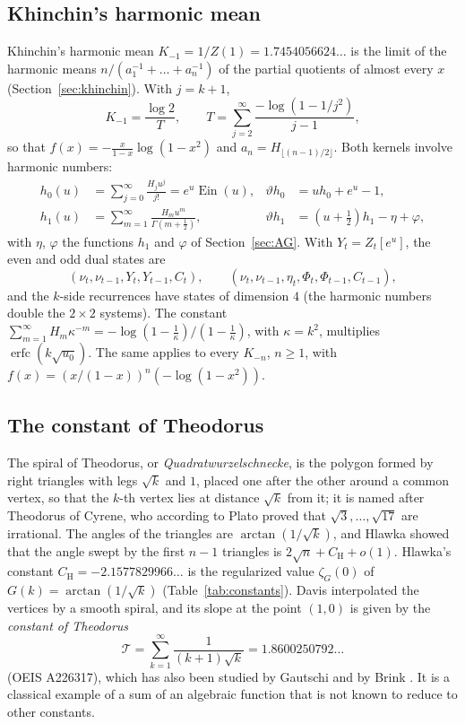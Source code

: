 \documentclass[11pt,reqno]{amsart}
\theoremstyle{definition}
\theoremstyle{remark}
\newcommand{\erfc}{\operatorname{erfc}}
\newcommand{\Ein}{\operatorname{Ein}}
\begin{document}
\subsection{Khinchin's harmonic mean}\label{sec:KH}
Khinchin's harmonic mean $K_{-1} = 1/Z(1) = 1.7454056624\ldots$ is the limit of the harmonic means
$n/(a_1^{-1} + \dots + a_n^{-1})$ of the partial quotients of almost every $x$ (Section~\ref{sec:khinchin}). With
$j = k+1$,
\[
  K_{-1} = \frac{\log 2}{T}, \qquad T = \sum_{j=2}^{\infty}\frac{-\log(1-1/j^2)}{j-1},
\]
so that $f(x) = -\frac{x}{1-x}\log(1-x^2)$ and $a_n = H_{\lfloor(n-1)/2\rfloor}$.
Both kernels involve harmonic numbers:
\begin{align*}
  h_0(u) &= \sum_{j=0}^{\infty}\frac{H_j u^j}{j!} = e^u\Ein(u), & \vartheta h_0 &= uh_0 + e^u - 1, \\
  h_1(u) &= \sum_{m=1}^{\infty}\frac{H_mu^m}{\Gamma(m+\frac12)}, & \vartheta h_1 &= (u+\tfrac12)h_1 - \eta + \varphi,
\end{align*}
with $\eta$, $\varphi$ the functions $h_1$ and $\varphi$ of Section~\ref{sec:AG}. With $Y_t = Z_t[e^u]$, the even
and odd dual states are
\[
  (\nu_t, \nu_{t-1}, Y_t, Y_{t-1}, C_t), \qquad (\nu_t, \nu_{t-1}, \eta_t, \Phi_t, \Phi_{t-1}, C_{t-1}),
\]
and
the $k$-side recurrences have states of dimension $4$ (the harmonic numbers double the $2\times2$ systems). The
constant $\sum_{m=1}^{\infty} H_m\kappa^{-m} = -\log(1-\frac1\kappa)/(1-\frac1\kappa)$, with $\kappa = k^2$, multiplies $\erfc(k\sqrt{u_0})$.
The same applies to every $K_{-n}$, $n \ge 1$, with $f(x) = (x/(1-x))^n(-\log(1-x^2))$.

\subsection{The constant of Theodorus}\label{sec:theodorus}
The spiral of Theodorus, or \emph{Quadrat\-wurzel\-schnecke}, is the polygon formed by right triangles with legs $\sqrt k$
and $1$, placed one after the other around a common vertex, so that the $k$-th vertex lies at distance $\sqrt k$ from
it; it is named after Theodorus of Cyrene, who according to Plato proved that $\sqrt3, \dots, \sqrt{17}$ are
irrational. The angles of the triangles are $\arctan(1/\sqrt k)$, and Hlawka \cite{Hla80} showed that the angle swept
by the first $n-1$ triangles is $2\sqrt n + C_{\mathrm H} + o(1)$. Hlawka's constant $C_{\mathrm H} = -2.1577829966\ldots$ is
the regularized value $\zeta_G(0)$ of $G(k) = \arctan(1/\sqrt k)$ (Table~\ref{tab:constants}). Davis \cite{Dav93} interpolated the vertices by a smooth spiral, and its slope at the
point $(1,0)$ is given by the \emph{constant of Theodorus}
\[
  \mathcal T = \sum_{k=1}^{\infty}\frac{1}{(k+1)\sqrt k} = 1.8600250792\ldots
\]
(OEIS A226317), which has also been studied by Gautschi \cite{Gau10} and by Brink \cite{Bri12}. It is a classical
example of a sum of an algebraic function that is not known to reduce to other constants.
\end{document}
